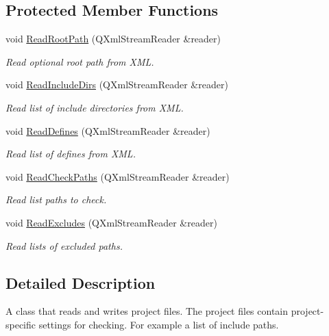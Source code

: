 \subsection*{Protected Member Functions}
\begin{DoxyCompactItemize}
\item 
void \hyperlink{class_project_file_abcce33affe9d0f05a19439aa1859d1a6}{Read\-Root\-Path} (Q\-Xml\-Stream\-Reader \&reader)
\begin{DoxyCompactList}\small\item\em Read optional root path from X\-M\-L. \end{DoxyCompactList}\item 
void \hyperlink{class_project_file_a00782c2703b2335eeb90f5146d685b18}{Read\-Include\-Dirs} (Q\-Xml\-Stream\-Reader \&reader)
\begin{DoxyCompactList}\small\item\em Read list of include directories from X\-M\-L. \end{DoxyCompactList}\item 
void \hyperlink{class_project_file_a49a536f23393a4d57456a207dd0d9e44}{Read\-Defines} (Q\-Xml\-Stream\-Reader \&reader)
\begin{DoxyCompactList}\small\item\em Read list of defines from X\-M\-L. \end{DoxyCompactList}\item 
void \hyperlink{class_project_file_af19c667d1dbc4b94c5a995d35a966268}{Read\-Check\-Paths} (Q\-Xml\-Stream\-Reader \&reader)
\begin{DoxyCompactList}\small\item\em Read list paths to check. \end{DoxyCompactList}\item 
void \hyperlink{class_project_file_a5eab4d466bf8dffe88fba8811627f4c9}{Read\-Excludes} (Q\-Xml\-Stream\-Reader \&reader)
\begin{DoxyCompactList}\small\item\em Read lists of excluded paths. \end{DoxyCompactList}\end{DoxyCompactItemize}


\subsection{Detailed Description}
A class that reads and writes project files. The project files contain project-\/specific settings for checking. For example a list of include paths. 

